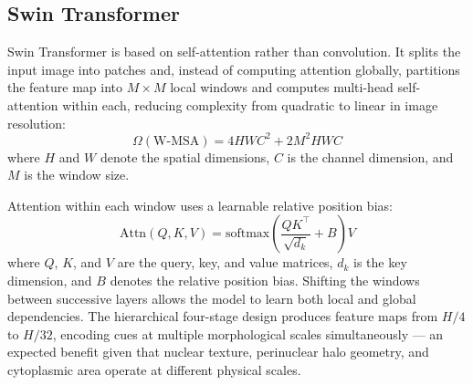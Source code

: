 \documentclass[conference]{IEEEtran}
\begin{document}
\subsection{Swin Transformer}

Swin Transformer \cite{liu2021swin} is based on self-attention rather than convolution. It splits the input image into patches and, instead of computing attention globally, partitions the feature map into $M\times M$ local windows and computes multi-head self-attention within each, reducing complexity from quadratic to linear in image resolution:
\begin{equation}
    \Omega(\mathrm{W\text{-}MSA}) = 4HWC^2 + 2M^2HWC
    \label{eq:wmsa}
\end{equation}
where $H$ and $W$ denote the spatial dimensions, $C$ is the channel dimension, and $M$ is the window size.

Attention within each window uses a learnable relative position bias:
\begin{equation}
    \mathrm{Attn}(Q,K,V) = \mathrm{softmax}\!\left(\frac{QK^\top}{\sqrt{d_k}} + B\right)V
    \label{eq:attn}
\end{equation}
where $Q$, $K$, and $V$ are the query, key, and value matrices, $d_k$ is the key dimension, and $B$ denotes the relative position bias. Shifting the windows between successive layers allows the model to learn both local and global dependencies. The hierarchical four-stage design produces feature maps from $H/4$ to $H/32$, encoding cues at multiple morphological scales simultaneously --- an expected benefit given that nuclear texture, perinuclear halo geometry, and cytoplasmic area operate at different physical scales.
\end{document}
